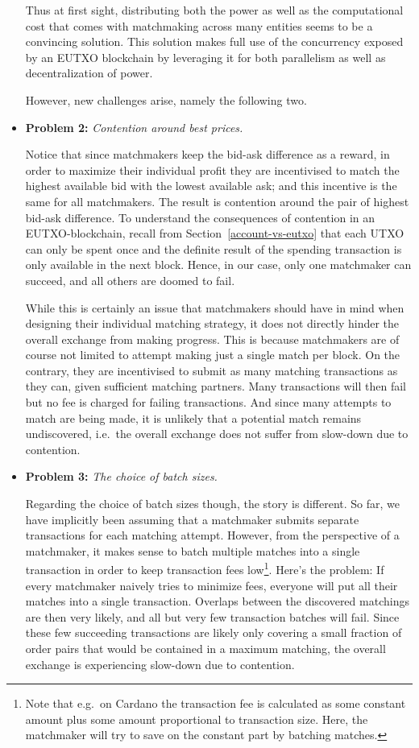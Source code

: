 \documentclass[11pt]{article}
\begin{document}
\begin{itemize}
    Thus at first sight, distributing both the power as well as the computational cost that comes with matchmaking across many entities seems to be a convincing solution. This solution makes full use of the concurrency exposed by an EUTXO blockchain by leveraging it for both parallelism as well as decentralization of power.
    
    However, new challenges arise, namely the following two. \cite{price-contention}

    \item \textbf{Problem 2:} \emph{Contention around best prices.}
    
    Notice that since matchmakers keep the bid-ask difference as a reward, in order to maximize their individual profit they are incentivised to match the highest available bid with the lowest available ask; and this incentive is the same for all matchmakers. The result is contention around the pair of highest bid-ask difference. To understand the consequences of contention in an EUTXO-blockchain, recall from Section~\ref{account-vs-eutxo} that each UTXO can only be spent once and the definite result of the spending transaction is only available in the next block. Hence, in our case, only one matchmaker can succeed, and all others are doomed to fail.
    
    While this is certainly an issue that matchmakers should have in mind when designing their individual matching strategy, it does not directly hinder the overall exchange from making progress. This is because matchmakers are of course not limited to attempt making just a single match per block. On the contrary, they are incentivised to submit as many matching transactions as they can, given sufficient matching partners. Many transactions will then fail but no fee is charged for failing transactions. And since many attempts to match are being made, it is unlikely that a potential match remains undiscovered, i.e.\ the overall exchange does not suffer from slow-down due to contention.
    
    \item \textbf{Problem 3:} \emph{The choice of batch sizes.}
    
    Regarding the choice of batch sizes though, the story is different. So far, we have implicitly been assuming that a matchmaker submits separate transactions for each matching attempt. However, from the perspective of a matchmaker, it makes sense to batch multiple matches into a single transaction in order to keep transaction fees low\footnote{Note that e.g.\ on Cardano the transaction fee is calculated as some constant amount plus some amount proportional to transaction size. Here, the matchmaker will try to save on the constant part by batching matches.}. Here's the problem: If every matchmaker naively tries to minimize fees, everyone will put all their matches into a single transaction. Overlaps between the discovered matchings are then very likely, and all but very few transaction batches will fail. Since these few succeeding transactions are likely only covering a small fraction of order pairs that would be contained in a maximum matching, the overall exchange is experiencing slow-down due to contention.
    

\end{itemize}
\end{document}
